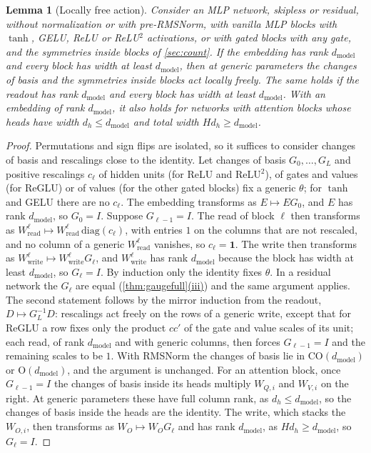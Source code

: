 \documentclass[10pt]{article}
\newtheorem{lemma}[theorem]{Lemma}
\theoremstyle{definition}
\theoremstyle{remark}
\newcommand{\Wread}{W_{\mathrm{read}}}
\newcommand{\Wwrite}{W_{\mathrm{write}}}
\newcommand{\dm}{d_{\mathrm{model}}}
\newcommand{\Ort}{\mathrm{O}}
\newcommand{\CO}{\mathrm{CO}}
\DeclareRobustCommand{\cpref}[2]{\hyperref[#1:#2]{\cref*{#1}(#2)}}
\begin{document}
\begin{lemma}[Locally free action]\label{lem:free}
Consider an MLP network, skipless or residual, without normalization or with pre-RMSNorm, with vanilla MLP blocks with $\tanh$, GELU, ReLU or ReLU$^2$ activations, or with gated blocks with any gate, and the symmetries inside blocks of \cref{sec:count}. If the embedding has rank $\dm$ and every block has width at least $\dm$, then at generic parameters the changes of basis and the symmetries inside blocks act locally freely. The same holds if the readout has rank $\dm$ and every block has width at least $\dm$. With an embedding of rank $\dm$, it also holds for networks with attention blocks whose heads have width $d_h \le \dm$ and total width $Hd_h \ge \dm$.
\end{lemma}

\begin{proof}
Permutations and sign flips are isolated, so it suffices to consider changes of basis and rescalings close to the identity. Let changes of basis $G_0, \dots, G_L$ and positive rescalings $c_\ell$ of hidden units (for ReLU and ReLU$^2$), of gates and values (for ReGLU) or of values (for the other gated blocks) fix a generic $\theta$; for $\tanh$ and GELU there are no $c_\ell$. The embedding transforms as $E \mapsto EG_0$, and $E$ has rank $\dm$, so $G_0 = I$. Suppose $G_{\ell-1} = I$. The read of block $\ell$ then transforms as $\Wread^\ell \mapsto \Wread^\ell\,\mathrm{diag}(c_\ell)$, with entries $1$ on the columns that are not rescaled, and no column of a generic $\Wread^\ell$ vanishes, so $c_\ell = \mathbf 1$. The write then transforms as $\Wwrite^\ell \mapsto \Wwrite^\ell G_\ell$, and $\Wwrite^\ell$ has rank $\dm$ because the block has width at least $\dm$, so $G_\ell = I$. By induction only the identity fixes $\theta$. In a residual network the $G_\ell$ are equal (\cpref{thm:gaugefull}{iii}) and the same argument applies. The second statement follows by the mirror induction from the readout, $D \mapsto G_L^{-1}D$: rescalings act freely on the rows of a generic write, except that for ReGLU a row fixes only the product $cc'$ of the gate and value scales of its unit; each read, of rank $\dm$ and with generic columns, then forces $G_{\ell-1} = I$ and the remaining scales to be $1$. With RMSNorm the changes of basis lie in $\CO(\dm)$ or $\Ort(\dm)$, and the argument is unchanged. For an attention block, once $G_{\ell-1} = I$ the changes of basis inside its heads multiply $W_{Q,i}$ and $W_{V,i}$ on the right. At generic parameters these have full column rank, as $d_h \le \dm$, so the changes of basis inside the heads are the identity. The write, which stacks the $W_{O,i}$, then transforms as $W_O \mapsto W_OG_\ell$ and has rank $\dm$, as $Hd_h \ge \dm$, so $G_\ell = I$.
\end{proof}
\end{document}
